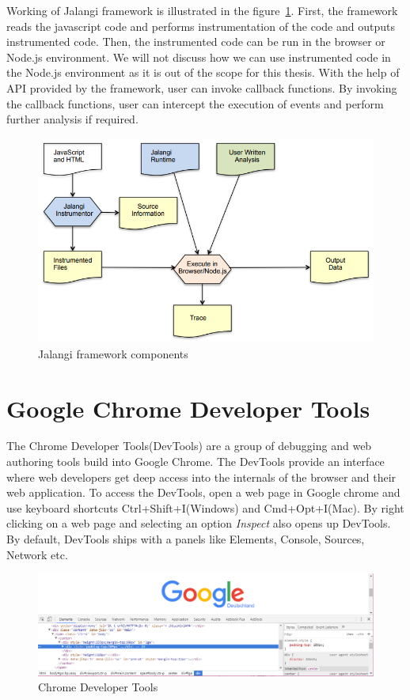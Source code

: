 Working of Jalangi framework is illustrated in the figure~\ref{fig:jalangi-components}. First, the framework reads the javascript code and performs instrumentation of the code and outputs instrumented code. Then, the instrumented code can be run in the browser or Node.js environment. We will not discuss how we can use instrumented code in the Node.js environment as it is out of the scope for this thesis. With the help of API provided by the framework, user can invoke callback functions. By invoking the callback functions, user can intercept the execution of events and perform further analysis if required. 

\begin{figure}[!h]
	\centering
	\includegraphics[scale=0.5,trim=0 0 0 0]{images/jalangi-components.png}
	\caption{Jalangi framework components}
	\label{fig:jalangi-components}
\end{figure}

\section{Google Chrome Developer Tools}
The Chrome Developer Tools(DevTools) are a group of debugging and web authoring tools build into Google Chrome\cite{devtools}. The DevTools provide an interface where web developers get deep access into the internals of the browser and their web application. To access the DevTools, open a web page in Google chrome and use keyboard shortcuts Ctrl+Shift+I(Windows) and Cmd+Opt+I(Mac). By right clicking on a web page and selecting an option \textit{Inspect} also opens up DevTools. By default, DevTools ships with a panels like Elements, Console, Sources, Network etc.

\begin{figure}[!h]
	\centering
	\includegraphics[scale=0.5,trim=0 0 0 0]{images/chrome-devtools.png}
	\caption{Chrome Developer Tools}
	\label{fig:devtools}
\end{figure}

